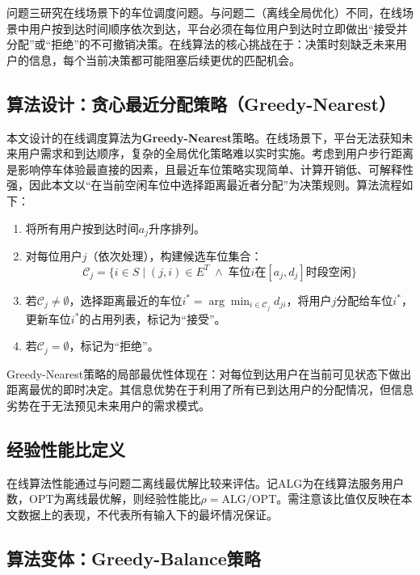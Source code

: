 \documentclass[12pt,a4paper]{ctexart}
\begin{document}
问题三研究在线场景下的车位调度问题。与问题二（离线全局优化）不同，在线场景中用户按到达时间顺序依次到达，平台必须在每位用户到达时立即做出``接受并分配''或``拒绝''的不可撤销决策。在线算法的核心挑战在于：决策时刻缺乏未来用户的信息，每个当前决策都可能阻塞后续更优的匹配机会。

\subsection{算法设计：贪心最近分配策略（Greedy-Nearest）}

本文设计的在线调度算法为\textbf{Greedy-Nearest}策略。在线场景下，平台无法获知未来用户需求和到达顺序，复杂的全局优化策略难以实时实施。考虑到用户步行距离是影响停车体验最直接的因素，且最近车位策略实现简单、计算开销低、可解释性强，因此本文以``在当前空闲车位中选择距离最近者分配''为决策规则。算法流程如下：

\begin{enumerate}
  \item 将所有用户按到达时间$a_j$升序排列。
  \item 对每位用户$j$（依次处理），构建候选车位集合：
  \begin{equation}
    \mathcal{C}_j = \{i \in S \mid (j,i) \in E^T \;\wedge\; \text{车位}i\text{在}[a_j, d_j]\text{时段空闲}\}
  \end{equation}
  \item 若$\mathcal{C}_j \neq \emptyset$，选择距离最近的车位$i^* = \arg\min_{i \in \mathcal{C}_j} d_{ji}$，将用户$j$分配给车位$i^*$，更新车位$i^*$的占用列表，标记为``接受''。
  \item 若$\mathcal{C}_j = \emptyset$，标记为``拒绝''。
\end{enumerate}

Greedy-Nearest策略的局部最优性体现在：对每位到达用户在当前可见状态下做出距离最优的即时决定。其信息优势在于利用了所有已到达用户的分配情况，但信息劣势在于无法预见未来用户的需求模式。

\subsection{经验性能比定义}

在线算法性能通过与问题二离线最优解比较来评估。记ALG为在线算法服务用户数，OPT为离线最优解，则经验性能比$\rho = \text{ALG}/\text{OPT}$。需注意该比值仅反映在本文数据上的表现，不代表所有输入下的最坏情况保证。

\subsection{算法变体：Greedy-Balance策略}
\end{document}
